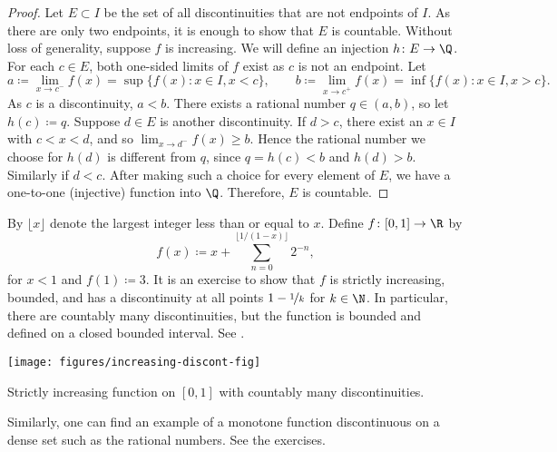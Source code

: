\begin{proof}
Let $E \subset I$ be the set of all discontinuities
that are not endpoints of $I$.  As there are
only two endpoints, it is enough to show that $E$ is countable.
Without loss of generality, suppose $f$ is increasing.
We will define an injection $h \colon E \to \Q$.
For each $c \in E$,
both one-sided limits of $f$ exist as $c$ is not an endpoint.
Let
\begin{equation*}
a
\coloneqq \lim_{x \to c^-} f(x) = \sup \bigl\{ f(x) : x \in I, x < c \bigr\} ,
\qquad
b
\coloneqq \lim_{x \to c^+} f(x) = \inf \bigl\{ f(x) : x \in I, x > c \bigr\} .
\end{equation*}
As $c$ is a discontinuity, $a < b$.  
There exists a rational number $q \in (a,b)$, so let $h(c) \coloneqq q$.
Suppose $d \in E$ is another discontinuity.
If $d > c$, there
exist an $x \in I$ with $c < x < d$, and so $\lim_{x \to d^-} f(x) \geq b$.
Hence the rational number we choose for $h(d)$ is different from $q$,
since $q=h(c) < b$ and $h(d) > b$.
Similarly if $d < c$.  After making such a choice for
every element of $E$, we have a 
one-to-one (injective) function into $\Q$.  Therefore, $E$ is countable.
\end{proof}

\begin{example} \label{example:countdiscont}
By $\lfloor x \rfloor$ denote the largest integer less than or equal to $x$.
Define $f \colon [0,1] \to \R$ by
\begin{equation*}
f(x) \coloneqq
x +
\sum_{n=0}^{\lfloor 1/(1-x) \rfloor}
2^{-n} ,
\end{equation*}
for $x < 1$ and $f(1) \coloneqq 3$.
It is an exercise to show that $f$ is strictly increasing, bounded, and
has a discontinuity at all points $1-\nicefrac{1}{k}$ for $k \in \N$.  In particular,
there are countably many discontinuities, but the function is bounded and
defined on a closed bounded interval.  See .
\begin{myfigureht}
\texttt{[image: figures/increasing-discont-fig]}
\caption{Strictly increasing function on $[0,1]$ with countably many
discontinuities.\label{fig:countdiscont}}
\end{myfigureht}

Similarly, one can find an example of a monotone function discontinuous on a dense set
such as the rational numbers.  See the exercises.
\end{example}


